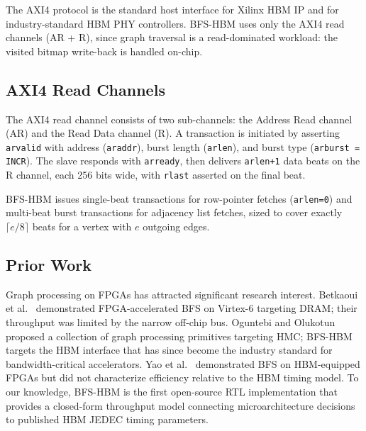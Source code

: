 The AXI4 protocol is the standard host interface for Xilinx HBM IP and for
industry-standard HBM PHY controllers. BFS-HBM uses only the AXI4 read channels
(AR + R), since graph traversal is a read-dominated workload: the visited bitmap
write-back is handled on-chip.

\subsection{AXI4 Read Channels}

The AXI4 read channel consists of two sub-channels: the Address Read channel (AR)
and the Read Data channel (R). A transaction is initiated by asserting
\texttt{arvalid} with address (\texttt{araddr}), burst length (\texttt{arlen}),
and burst type (\texttt{arburst = INCR}). The slave responds with \texttt{arready},
then delivers \texttt{arlen+1} data beats on the R channel, each 256 bits wide,
with \texttt{rlast} asserted on the final beat.

BFS-HBM issues single-beat transactions for row-pointer fetches (\texttt{arlen=0})
and multi-beat burst transactions for adjacency list fetches, sized to cover exactly
$\lceil e/8 \rceil$ beats for a vertex with $e$ outgoing edges.

\subsection{Prior Work}

Graph processing on FPGAs has attracted significant research interest.
Betkaoui et al.~\cite{betkaoui2012reconfigurable} demonstrated FPGA-accelerated BFS
on Virtex-6 targeting DRAM; their throughput was limited by the narrow off-chip bus.
Oguntebi and Olukotun~\cite{oguntebi2016graphops} proposed a collection of graph
processing primitives targeting HMC; BFS-HBM targets the HBM interface that has
since become the industry standard for bandwidth-critical accelerators.
Yao et al.~\cite{yao2018efficient} demonstrated BFS on HBM-equipped FPGAs but
did not characterize efficiency relative to the HBM timing model.
To our knowledge, BFS-HBM is the first open-source RTL implementation that
provides a closed-form throughput model connecting microarchitecture decisions to
published HBM JEDEC timing parameters.
